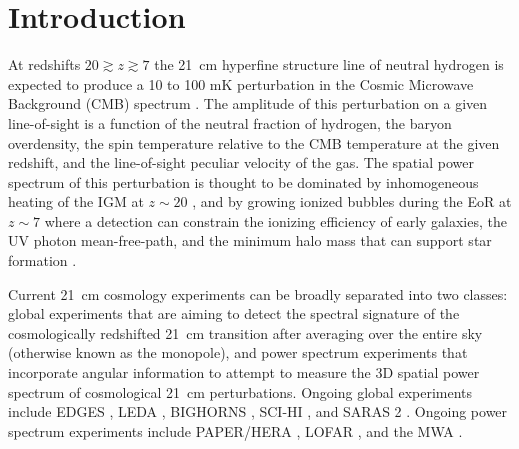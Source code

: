\documentclass[twocolumn]{aastex61}
\begin{document}

\section{Introduction}

At redshifts $20 \gtrsim z \gtrsim 7$ the 21~cm hyperfine structure line of neutral hydrogen is
expected to produce a 10 to 100 mK perturbation in the Cosmic Microwave Background (CMB) spectrum
\citep{2006PhR...433..181F, 2012RPPh...75h6901P}. The amplitude of this perturbation on a given
line-of-sight is a function of the neutral fraction of hydrogen, the baryon overdensity, the spin
temperature relative to the CMB temperature at the given redshift, and the line-of-sight peculiar
velocity of the gas.  The spatial power spectrum of this perturbation is thought to be dominated by
inhomogeneous heating of the IGM at $z\sim 20$ \citep{2014MNRAS.437L..36F}, and by growing ionized
bubbles during the EoR at $z\sim 7$ where a detection can constrain the ionizing efficiency of early
galaxies, the UV photon mean-free-path, and the minimum halo mass that can support star formation
\citep{2015MNRAS.449.4246G}.

Current 21~cm cosmology experiments can be broadly separated into two classes: global experiments
that are aiming to detect the spectral signature of the cosmologically redshifted 21~cm transition
after averaging over the entire sky (otherwise known as the monopole), and power spectrum
experiments that incorporate angular information to attempt to measure the 3D spatial power spectrum
of cosmological 21~cm perturbations.  Ongoing global experiments include EDGES
\citep{2010Natur.468..796B, 2017ApJ...835...49M}, LEDA \citep{2017arXiv170909313P}, BIGHORNS
\citep{2015PASA...32....4S}, SCI-HI \citep{2014ApJ...782L...9V}, and SARAS 2
\citep{2017arXiv170306647S}.  Ongoing power spectrum experiments include PAPER/HERA
\citep{2015ApJ...809...61A, 2016arXiv160607473D}, LOFAR \citep{2017ApJ...838...65P}, and the MWA
\citep{2016ApJ...833..102B, 2016MNRAS.460.4320E}.
\end{document}

